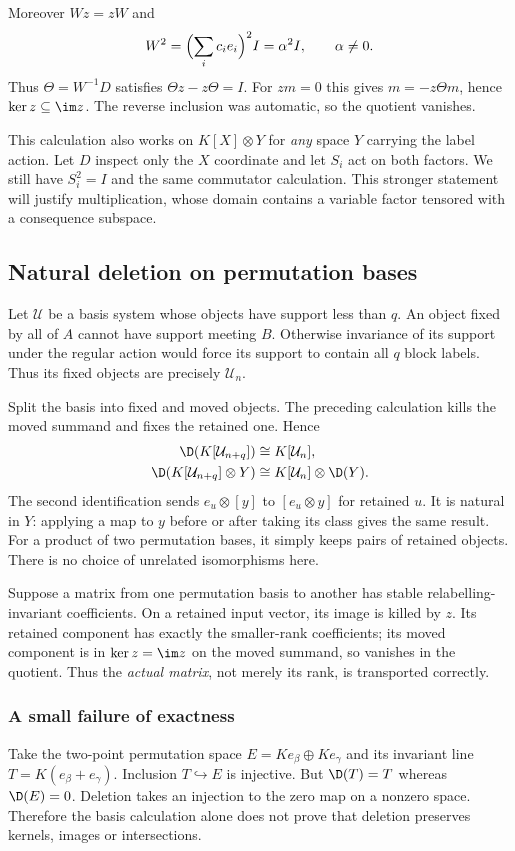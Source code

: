 Moreover $Wz=zW$ and
\[W^2=\Bigl(\sum_i c_ie_i\Bigr)^2I=\alpha^2I,\qquad\alpha\ne0.\]
Thus $\Theta=W^{-1}D$ satisfies $\Theta z-z\Theta=I$. For $zm=0$ this gives $m=-z\Theta m$, hence $\ker z\subseteq\im z$. The reverse inclusion was automatic, so the quotient vanishes.

This calculation also works on $K[X]\otimes Y$ for \emph{any} space $Y$ carrying the label action. Let $D$ inspect only the $X$ coordinate and let $S_i$ act on both factors. We still have $S_i^2=I$ and the same commutator calculation. This stronger statement will justify multiplication, whose domain contains a variable factor tensored with a consequence subspace.

\subsection{Natural deletion on permutation bases}
Let $\mathcal U$ be a basis system whose objects have support less than $q$. An object fixed by all of $A$ cannot have support meeting $B$. Otherwise invariance of its support under the regular action would force its support to contain all $q$ block labels. Thus its fixed objects are precisely $\mathcal U_n$.

Split the basis into fixed and moved objects. The preceding calculation kills the moved summand and fixes the retained one. Hence
\begin{align}
\D(K[\mathcal U_{n+q}])&\cong K[\mathcal U_n],\label{eq:basis}\\
\D(K[\mathcal U_{n+q}]\otimes Y)&\cong K[\mathcal U_n]\otimes\D(Y).\label{eq:tensor}
\end{align}
The second identification sends $e_u\otimes[y]$ to $[e_u\otimes y]$ for retained $u$. It is natural in $Y$: applying a map to $y$ before or after taking its class gives the same result. For a product of two permutation bases, it simply keeps pairs of retained objects. There is no choice of unrelated isomorphisms here.

Suppose a matrix from one permutation basis to another has stable relabelling-invariant coefficients. On a retained input vector, its image is killed by $z$. Its retained component has exactly the smaller-rank coefficients; its moved component is in $\ker z=\im z$ on the moved summand, so vanishes in the quotient. Thus the \emph{actual matrix}, not merely its rank, is transported correctly.

\subsubsection{A small failure of exactness}
Take the two-point permutation space $E=Ke_\beta\oplus Ke_\gamma$ and its invariant line $T=K(e_\beta+e_\gamma)$. Inclusion $T\hookrightarrow E$ is injective. But $\D(T)=T$ whereas $\D(E)=0$. Deletion takes an injection to the zero map on a nonzero space. Therefore the basis calculation alone does not prove that deletion preserves kernels, images or intersections.

